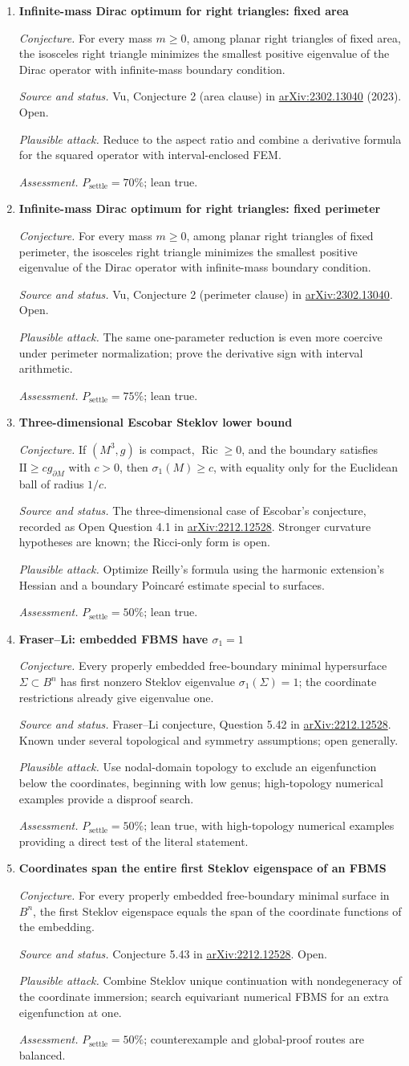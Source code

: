 \documentclass[11pt]{article}
\newcommand{\cand}[5]{%
  \item \textbf{#1}\par
  \emph{Conjecture.} #2\par
  \emph{Source and status.} #3\par
  \emph{Plausible attack.} #4\par
  \emph{Assessment.} #5
}
\newcommand{\psettle}{P_{\mathrm{settle}}}
\begin{document}
\begin{enumerate}[label=\textbf{M\arabic*.}]
\cand{Infinite-mass Dirac optimum for right triangles: fixed area}
{For every mass $m\ge0$, among planar right triangles of fixed area, the isosceles right triangle minimizes the smallest positive eigenvalue of the Dirac operator with infinite-mass boundary condition.}
{Vu, Conjecture 2 (area clause) in \href{https://arxiv.org/abs/2302.13040}{arXiv:2302.13040} (2023).  Open.}
{Reduce to the aspect ratio and combine a derivative formula for the squared operator with interval-enclosed FEM.}
{$\psettle=70\%$; lean true.}

\cand{Infinite-mass Dirac optimum for right triangles: fixed perimeter}
{For every mass $m\ge0$, among planar right triangles of fixed perimeter, the isosceles right triangle minimizes the smallest positive eigenvalue of the Dirac operator with infinite-mass boundary condition.}
{Vu, Conjecture 2 (perimeter clause) in \href{https://arxiv.org/abs/2302.13040}{arXiv:2302.13040}.  Open.}
{The same one-parameter reduction is even more coercive under perimeter normalization; prove the derivative sign with interval arithmetic.}
{$\psettle=75\%$; lean true.}

\cand{Three-dimensional Escobar Steklov lower bound}
{If $(M^3,g)$ is compact, $\operatorname{Ric}\ge0$, and the boundary satisfies $\mathrm{II}\ge c g_{\partial M}$ with $c>0$, then $\sigma_1(M)\ge c$, with equality only for the Euclidean ball of radius $1/c$.}
{The three-dimensional case of Escobar's conjecture, recorded as Open Question 4.1 in \href{https://arxiv.org/abs/2212.12528}{arXiv:2212.12528}.  Stronger curvature hypotheses are known; the Ricci-only form is open.}
{Optimize Reilly's formula using the harmonic extension's Hessian and a boundary Poincar\'e estimate special to surfaces.}
{$\psettle=50\%$; lean true.}

\cand{Fraser--Li: embedded FBMS have $\sigma_1=1$}
{Every properly embedded free-boundary minimal hypersurface $\Sigma\subset B^n$ has first nonzero Steklov eigenvalue $\sigma_1(\Sigma)=1$; the coordinate restrictions already give eigenvalue one.}
{Fraser--Li conjecture, Question 5.42 in \href{https://arxiv.org/abs/2212.12528}{arXiv:2212.12528}.  Known under several topological and symmetry assumptions; open generally.}
{Use nodal-domain topology to exclude an eigenfunction below the coordinates, beginning with low genus; high-topology numerical examples provide a disproof search.}
{$\psettle=50\%$; lean true, with high-topology numerical examples providing a direct test of the literal statement.}

\cand{Coordinates span the entire first Steklov eigenspace of an FBMS}
{For every properly embedded free-boundary minimal surface in $B^n$, the first Steklov eigenspace equals the span of the coordinate functions of the embedding.}
{Conjecture 5.43 in \href{https://arxiv.org/abs/2212.12528}{arXiv:2212.12528}.  Open.}
{Combine Steklov unique continuation with nondegeneracy of the coordinate immersion; search equivariant numerical FBMS for an extra eigenfunction at one.}
{$\psettle=50\%$; counterexample and global-proof routes are balanced.}


\end{enumerate}
\end{document}
